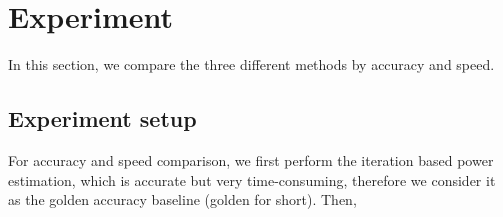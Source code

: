 \section{Experiment}
In this section, we compare the three different methods by accuracy and speed.

\subsection{Experiment setup}
For accuracy and speed comparison, we first perform the iteration based power estimation, which is accurate but very time-consuming, therefore we consider it as the golden accuracy baseline (golden for short). Then, 